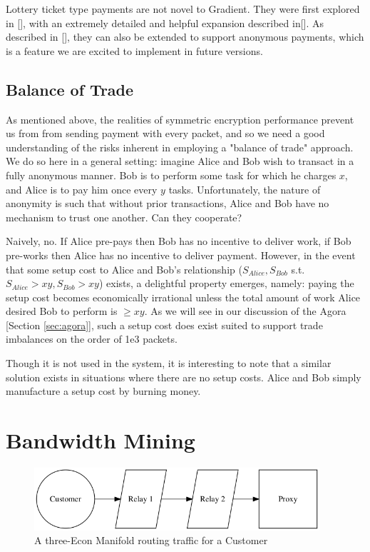 \documentclass{article}
\begin{document}
Lottery ticket type payments are not novel to Gradient. They were first explored in [], with an extremely detailed and helpful expansion described in[]. As described in [], they can also be extended to support anonymous payments, which is a feature we are excited to implement in future versions.

\subsection{Balance of Trade}
\label{tokens-bot}

As mentioned above, the realities of symmetric encryption performance prevent us from from sending payment with every packet, and so we need a good understanding of the risks inherent in employing a "balance of trade" approach. We do so here in a general setting: imagine Alice and Bob wish to transact in a fully anonymous manner. Bob is to perform some task for which he charges $x$, and Alice is to pay him once every $y$ tasks. Unfortunately, the nature of anonymity is such that without prior transactions, Alice and Bob have no mechanism to trust one another. Can they cooperate?

Naively, no. If Alice pre-pays then Bob has no incentive to deliver work, if Bob pre-works then Alice has no incentive to deliver payment. However, in the event that some setup cost to Alice and Bob's relationship ($S_{Alice}, S_{Bob}$ s.t. $S_{Alice} > xy, S_{Bob} > xy$) exists, a delightful property emerges, namely: paying the setup cost becomes economically irrational unless the total amount of work Alice desired Bob to perform is $\geq xy$. As we will see in our discussion of the Agora [Section \ref{sec:agora}], such a setup cost does exist suited to support trade imbalances on the order of 1e3 packets.

Though it is not used in the system, it is interesting to note that a similar solution exists in situations where there are no setup costs. Alice and Bob simply manufacture a setup cost by burning money.

\section{Bandwidth Mining}
\label{sec:mining}

\begin{figure}[htbp]
  \centering
  \includegraphics[width = 300pt]{sttc}
  \caption{A three-Econ Manifold routing traffic for a Customer}
\end{figure}
\end{document}
